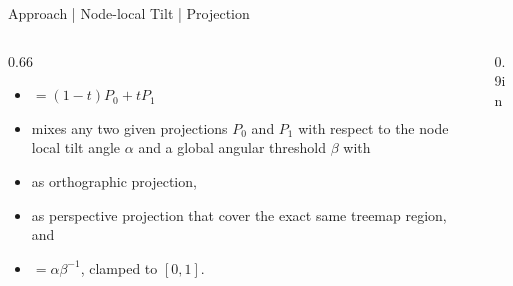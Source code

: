 \documentclass[aspectratio=169,10pt,english]{beamer}
\begin{document}
\begin{frame}[t]{Approach | Node-local Tilt | Projection}

    \bigskip

    \begin{columns}

        \begin{column}{0.66\textwidth}

            \begin{itemize}
                \Large
                \item[$\Gamma$] $= \left(1 - t\right) P_0 + t P_1$ \\

                \normalsize
                \bigskip
                \bigskip

                \item[] mixes any two given projections $P_0$ and $P_1$ with respect to the node local tilt angle $\alpha$ and a global angular threshold $\beta$ with

                \pause
                \item[$P_0$] as orthographic projection,

                \pause
                \item [$P_1$] as perspective projection that cover the exact same treemap region, and

                \pause
                \item [$t$] $= \alpha\beta^{-1}$, clamped to $\left[0,1\right]$.

            \end{itemize}

            \bigskip

        \end{column}

        \begin{column}{0.9in}

        \end{column}

    \end{columns}

\end{frame}
\end{document}
